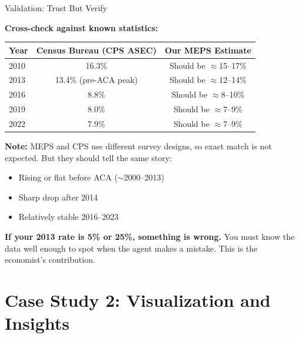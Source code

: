 \documentclass[10pt,english,aspectratio=169]{beamer}
\begin{document}
\begin{frame}{Validation: Trust But Verify}

\textbf{Cross-check against known statistics:}

\vspace{0.2cm}
\begin{small}
\begin{tabular}{lcc}
\toprule
\textbf{Year} & \textbf{Census Bureau (CPS ASEC)} & \textbf{Our MEPS Estimate} \\
\midrule
2010 & 16.3\% & Should be $\approx$15--17\% \\
2013 & 13.4\% (pre-ACA peak) & Should be $\approx$12--14\% \\
2016 & 8.8\% & Should be $\approx$8--10\% \\
2019 & 8.0\% & Should be $\approx$7--9\% \\
2022 & 7.9\% & Should be $\approx$7--9\% \\
\bottomrule
\end{tabular}
\end{small}

\vspace{0.3cm}
\textbf{Note:} MEPS and CPS use different survey designs, so exact match is not expected. But they should tell the same story:
\begin{itemize}
    \item Rising or flat before ACA ($\sim$2000--2013)
    \item Sharp drop after 2014
    \item Relatively stable 2016--2023
\end{itemize}

\vspace{0.2cm}
\textbf{If your 2013 rate is 5\% or 25\%, something is wrong.} You must know the data well enough to spot when the agent makes a mistake. This is the economist's contribution.

\end{frame}


\section{Case Study 2: Visualization and Insights}
\end{document}
